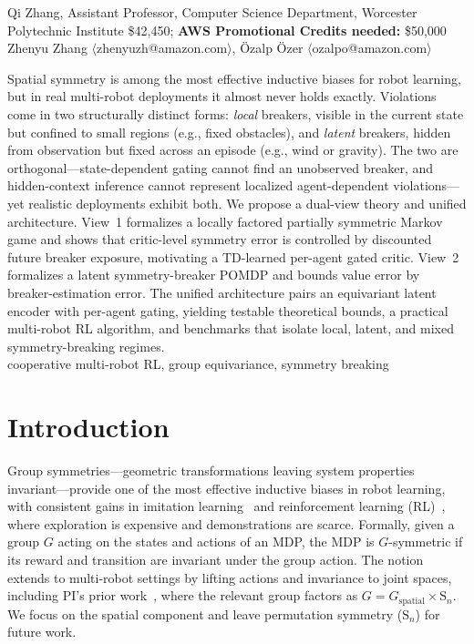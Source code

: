 \documentclass[11pt]{article}
\begin{document}

 Qi Zhang, Assistant Professor, Computer Science Department, Worcester Polytechnic Institute
 \$42,450; \qquad
{\bf AWS Promotional Credits needed:} \$50,000\\
Zhenyu Zhang $\langle$zhenyuzh@amazon.com$\rangle$,
Özalp Özer $\langle$ozalpo@amazon.com$\rangle$

Spatial symmetry is among the most effective inductive biases for robot learning, but in real multi-robot deployments it almost never holds exactly. Violations come in two structurally distinct forms: \emph{local} breakers, visible in the current state but confined to small regions (e.g., fixed obstacles), and \emph{latent} breakers, hidden from observation but fixed across an episode (e.g., wind or gravity). The two are orthogonal—state-dependent gating cannot find an unobserved breaker, and hidden-context inference cannot represent localized agent-dependent violations—yet realistic deployments exhibit both. We propose a dual-view theory and unified architecture. View~1 formalizes a locally factored partially symmetric Markov game and shows that critic-level symmetry error is controlled by discounted future breaker exposure, motivating a TD-learned per-agent gated critic. View~2 formalizes a latent symmetry-breaker POMDP and bounds value error by breaker-estimation error. The unified architecture pairs an equivariant latent encoder with per-agent gating, yielding testable theoretical bounds, a practical multi-robot RL algorithm, and benchmarks that isolate local, latent, and mixed symmetry-breaking regimes.\\
cooperative multi-robot RL, group equivariance, symmetry breaking


\section{Introduction}
Group symmetries—geometric transformations leaving system properties invariant—provide one of the most effective inductive biases in robot learning, with consistent gains in imitation learning~\citep{zeng2021transporter,wang2024equivariantdiffusion,seo2025survey} and reinforcement learning (RL)~\citep{vanderpol2020mdp,wang2022so2,luo2024reinforcement}, where exploration is expensive and demonstrations are scarce.
Formally, given a group $G$ acting on the states and actions of an MDP, the MDP is $G$-symmetric if its reward and transition are invariant under the group action.
The notion extends to multi-robot settings by lifting actions and invariance to joint spaces, including PI's prior work~\citep{chen2022communicationefficient,chen20243}, where the relevant group factors as $G = G_{\text{spatial}} \times \mathrm{S}_n$. We focus on the spatial component and leave permutation symmetry ($\mathrm{S}_n$) for future work.
\end{document}
